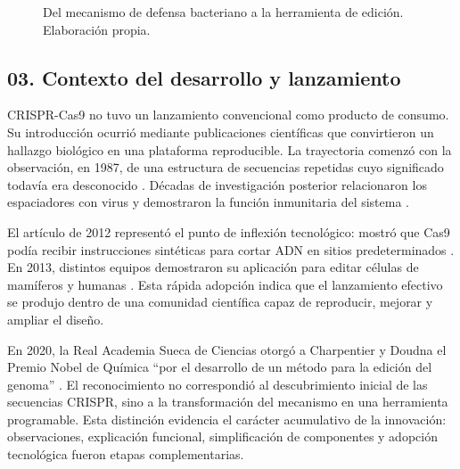 \documentclass[11pt,letterpaper]{article}
\begin{document}
\begin{figure}[ht]
  \centering
  \caption{Del mecanismo de defensa bacteriano a la herramienta de edición.
  Elaboración propia.}
  \label{fig:flujo-crispr}
\end{figure}

\subsection*{03. Contexto del desarrollo y lanzamiento}

CRISPR-Cas9 no tuvo un lanzamiento convencional como producto de consumo. Su
introducción ocurrió mediante publicaciones científicas que convirtieron un
hallazgo biológico en una plataforma reproducible. La trayectoria comenzó con
la observación, en 1987, de una estructura de secuencias repetidas cuyo
significado todavía era desconocido \parencite{ishino1987}. Décadas de
investigación posterior relacionaron los espaciadores con virus y demostraron
la función inmunitaria del sistema \parencite{barrangou2007}.

El artículo de 2012 representó el punto de inflexión tecnológico: mostró que
Cas9 podía recibir instrucciones sintéticas para cortar ADN en sitios
predeterminados \parencite{jinek2012}. En 2013, distintos equipos demostraron
su aplicación para editar células de mamíferos y humanas
\parencite{cong2013,mali2013}. Esta rápida adopción indica que el lanzamiento
efectivo se produjo dentro de una comunidad científica capaz de reproducir,
mejorar y ampliar el diseño.

En 2020, la Real Academia Sueca de Ciencias otorgó a Charpentier y Doudna el
Premio Nobel de Química ``por el desarrollo de un método para la edición del
genoma'' \parencite{nobel2020}. El reconocimiento no correspondió al
descubrimiento inicial de las secuencias CRISPR, sino a la transformación del
mecanismo en una herramienta programable. Esta distinción evidencia el
carácter acumulativo de la innovación: observaciones, explicación funcional,
simplificación de componentes y adopción tecnológica fueron etapas
complementarias.
\end{document}
